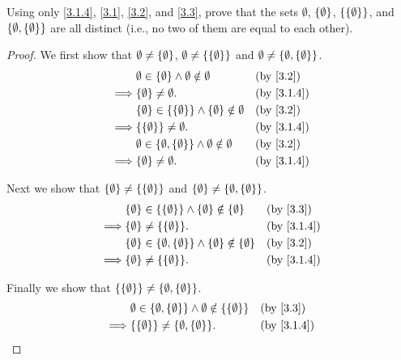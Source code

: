 \begin{ex}\label{ex:3.1.2}
  Using only \cref{3.1.4}, \cref{3.1}, \cref{3.2}, and \cref{3.3}, prove that the sets \(\emptyset\), \(\left\lbrace\emptyset\right\rbrace\), \(\left\lbrace\left\lbrace\emptyset\right\rbrace\right\rbrace\), and \(\left\lbrace\emptyset, \left\lbrace\emptyset\right\rbrace\right\rbrace\) are all distinct
  (i.e., no two of them are equal to each other).
\end{ex}

\begin{proof}
  We first show that \(\emptyset \neq \left\lbrace\emptyset\right\rbrace\), \(\emptyset \neq \left\lbrace\left\lbrace\emptyset\right\rbrace\right\rbrace\) and \(\emptyset \neq \left\lbrace\emptyset, \left\lbrace\emptyset\right\rbrace\right\rbrace\).
  \begin{align*}
             & \emptyset \in \set{\emptyset} \land \emptyset \notin \emptyset                   &  & \by{3.2}   \\
    \implies & \set{\emptyset} \neq \emptyset.                                                  &  & \by{3.1.4} \\
             & \set{\emptyset} \in \set{\set{\emptyset}} \land \set{\emptyset} \notin \emptyset &  & \by{3.2}   \\
    \implies & \set{\set{\emptyset}} \neq \emptyset.                                            &  & \by{3.1.4} \\
             & \emptyset \in \set{\emptyset, \set{\emptyset}} \land \emptyset \notin \emptyset  &  & \by{3.2}   \\
    \implies & \set{\emptyset} \neq \emptyset.                                                  &  & \by{3.1.4}
  \end{align*}

  Next we show that \(\left\lbrace\emptyset\right\rbrace \neq \left\lbrace\left\lbrace\emptyset\right\rbrace\right\rbrace\) and \(\left\lbrace\emptyset\right\rbrace \neq \left\lbrace\emptyset, \left\lbrace\emptyset\right\rbrace\right\rbrace\).
  \begin{align*}
             & \set{\emptyset} \in \set{\set{\emptyset}} \land \set{\emptyset} \notin \set{\emptyset}            &  & \by{3.3}   \\
    \implies & \set{\emptyset} \neq \set{\set{\emptyset}}.                                                       &  & \by{3.1.4} \\
             & \set{\emptyset} \in \set{\emptyset, \set{\emptyset}} \land \set{\emptyset} \notin \set{\emptyset} &  & \by{3.2}   \\
    \implies & \set{\emptyset} \neq \set{\set{\emptyset}}.                                                       &  & \by{3.1.4}
  \end{align*}

  Finally we show that \(\left\lbrace\left\lbrace\emptyset\right\rbrace\right\rbrace \neq \left\lbrace\emptyset, \left\lbrace\emptyset\right\rbrace\right\rbrace\).
  \begin{align*}
             & \emptyset \in \set{\emptyset, \set{\emptyset}} \land \emptyset \notin \set{\set{\emptyset}} &  & \by{3.3}   \\
    \implies & \set{\set{\emptyset}} \neq \set{\emptyset, \set{\emptyset}}.                                &  & \by{3.1.4}
  \end{align*}
\end{proof}

